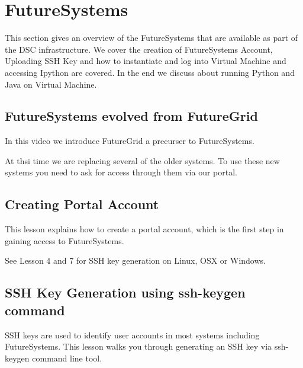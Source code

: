 
\chapter{FutureSystems}
\label{C:futuresystems}

\FILENAME

This section gives an overview of the FutureSystems that are available
as part of the DSC infrastructure. We cover the creation of 
FutureSystems Account, Uploading SSH Key and how to
instantiate and log into Virtual Machine and accessing Ipython are
covered. In the end we discuss about running Python and Java on Virtual
Machine.

\section{FutureSystems evolved from FutureGrid}

In this video we introduce FutureGrid a precurser to FutureSystems.


At thsi time we are replacing several of the older systems. To use
these new systems you need to ask for access through them via our portal.


\section{Creating Portal Account}

This lesson explains how to create a portal account, which is the first
step in gaining access to FutureSystems.

See Lesson 4 and 7 for SSH key generation on Linux, OSX or Windows.


\section{SSH Key Generation using ssh-keygen command}
\label{ssh-key-generation-using-ssh-keygen-command}

SSH keys are used to identify user accounts in most systems including
FutureSystems. This lesson walks you through generating an SSH key via
ssh-keygen command line tool.


